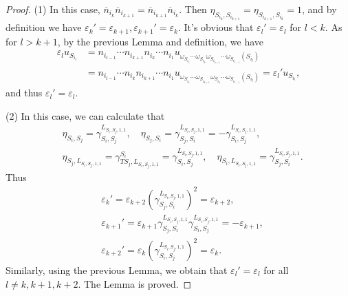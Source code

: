 \documentclass[12pt]{amsart}
\begin{document}
\begin{proof}
    (1) In this case, $\overline{n}_{i_k}\overline{n}_{i_{k+1}}=\overline{n}_{i_{k+1}}\overline{n}_{i_k}$. Then $\eta_{S_{i_k},S_{i_{k+1}}}=\eta_{S_{i_{k+1}},S_{i_{k}}}=1$, and by definition we have $\varepsilon_k'=\varepsilon_{k+1},\varepsilon_{k+1}'=\varepsilon_k$.
    It's obvious that $\varepsilon_l'=\varepsilon_l$ for $l<k$. As for $l>k+1$, by the previous Lemma and definition, we have
    \begin{align*}
        \varepsilon_l u_{S_{i_l}} &= n_{i_{l-1}}\cdots n_{i_{k+1}} n_{i_k} \cdots n_{i_1} u_{\omega_{S_{i_1}}\cdots \omega_{S_{i_k}}\omega_{S_{i_{k+1}}} \cdots \omega_{S_{i_{l-1}}}(S_{i_l})} \\
        &= n_{i_{l-1}}\cdots n_{i_{k}} n_{i_{k+1}} \cdots n_{i_1} u_{\omega_{S_{i_1}}\cdots \omega_{S_{i_{k+1}}}\omega_{S_{i_{k}}} \cdots \omega_{S_{i_{l-1}}}(S_{i_l})} = \varepsilon_l' u_{S_{i_l}},
    \end{align*}
    and thus $\varepsilon_l'=\varepsilon_l$.

    (2) In this case, we can calculate that 
    \begin{align*}
        &\eta_{S_i,S_j}=\gamma_{S_i,S_j}^{L_{S_i,S_j,1,1}}, \quad \eta_{S_j,S_i}=\gamma_{S_j,S_i}^{L_{S_i,S_j,1,1}}=-\gamma_{S_i,S_j}^{L_{S_i,S_j,1,1}},\\
        &\eta_{S_j,L_{S_i,S_j,1,1}}=\gamma_{TS_j,L_{S_i,S_j,1,1}}^{S_i}=\gamma_{S_i,S_j}^{L_{S_i,S_j,1,1}}, \quad \eta_{S_i,L_{S_i,S_j,1,1}}=\gamma_{S_j,S_i}^{L_{S_i,S_j,1,1}}.
    \end{align*}
    Thus 
    \begin{align*}
       & \varepsilon_k'=\varepsilon_{k+2}(\gamma_{S_j,S_i}^{L_{S_i,S_j,1,1}})^2=\varepsilon_{k+2},\\
        &  \varepsilon_{k+1}'=\varepsilon_{k+1}\gamma_{S_j,S_i}^{L_{S_i,S_j,1,1}}\gamma_{S_i,S_j}^{L_{S_i,S_j,1,1}}=-\varepsilon_{k+1}, \\
         &  \varepsilon_{k+2}'=\varepsilon_k(\gamma_{S_i,S_j}^{L_{S_i,S_j,1,1}})^2=\varepsilon_k.
    \end{align*}
    Similarly, using the previous Lemma, we obtain that  $\varepsilon_l'=\varepsilon_l$ for all $l\neq k,k+1,k+2$.
    The Lemma is proved.
\end{proof}
\end{document}
